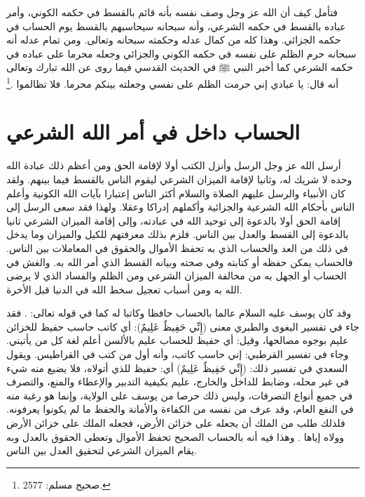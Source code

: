 فتأمل كيف أن الله عز وجل وصف نفسه بأنه قائم بالقسط في حكمه الكوني، وأمر عباده بالقسط في حكمه الشرعي، وأنه سبحانه سيحاسبهم بالقسط يوم الحساب في حكمه الجزائي. وهذا كله من كمال عدله وحكمته سبحانه وتعالى. ومن تمام عدله أنه سبحانه حرم الظلم على نفسه في حكمه الكوني والجزائي وجعله محرما على عباده في حكمه الشرعي كما أخبر النبي ﷺ في الحديث القدسي فيما روى عن الله تبارك وتعالى أنه قال: يا عبادي إني حرمت الظلم على نفسي وجعلته بينكم محرما. فلا تظالموا \href{https://shamela.ws/book/1727/6507#p3}{\faExternalLink} \cite{muslim}.\footnote{صحيح مسلم: 2577.}

\section{الحساب داخل في أمر الله الشرعي}

أرسل الله عز وجل الرسل وأنزل الكتب أولا لإقامة الحق ومن أعظم ذلك عبادة الله وحده لا شريك له، وثانيا لإقامة الميزان الشرعي ليقوم الناس بالقسط فيما بينهم. ولقد كان الأنبياء والرسل عليهم الصلاة والسلام أكثر الناس إعتبارا بآيات الله الكونية وأعلم الناس بأحكام الله الشرعية والجزائية وأكملهم إدراكا وعقلا. ولهذا فقد سعى الرسل إلى إقامة الحق أولا بالدعوة إلى توحيد الله في عبادته، وإلى إقامة الميزان الشرعي ثانيا بالدعوة إلى القسط والعدل بين الناس. فلزم بذلك معرفتهم للكيل والميزان وما يدخل في ذلك من العد والحساب الذي به تحفظ الأموال والحقوق في المعاملات بين الناس. فالحساب يمكن حفظه أو كتابته وفي صحته وبيانه القسط الذي أمر الله به. والغش في الحساب أو الجهل به من مخالفة الميزان الشرعي ومن الظلم والفساد الذي لا يرضى الله به ومن أسباب تعجيل سخط الله في الدنيا قبل الأخرة. 

وقد كان يوسف عليه السلام عالما بالحساب حافظا وكاتبا له كما في قوله تعالى: \quranayah*[12][55]{\footnotesize \surahname*[12]}. فقد جاء في تفسير البغوى والطبري معنى (إِنِّي حَفِيظٌ عَلِيمٌ): أي كاتب حاسب حفيظ للخزائن عليم بوجوه مصالحها، وقيل: أي حفيظ للحساب عليم بالألسن أعلم لغة كل من يأتيني. وجاء في تفسير القرطبي: إني حاسب كاتب، وأنه أول من كتب في القراطيس. ويقول السعدي في تفسير ذلك: (إِنِّي حَفِيظٌ عَلِيمٌ) أي: حفيظ للذي أتولاه، فلا يضيع منه شيء في غير محله، وضابط للداخل والخارج، عليم بكيفية التدبير والإعطاء والمنع، والتصرف في جميع أنواع التصرفات، وليس ذلك حرصا من يوسف على الولاية، وإنما هو رغبة منه في النفع العام، وقد عرف من نفسه من الكفاءة والأمانة والحفظ ما لم يكونوا يعرفونه. فلذلك طلب من الملك أن يجعله على خزائن الأرض، فجعله الملك على خزائن الأرض وولاه إياها \href{https://shamela.ws/book/42/841#p5}{\faExternalLink} \cite{tafsir_Saadi}. وهذا فيه أنه بالحساب الصحيح تحفظ الأموال وتعطى الحقوق بالعدل وبه يقام الميزان الشرعي لتحقيق العدل بين الناس.

